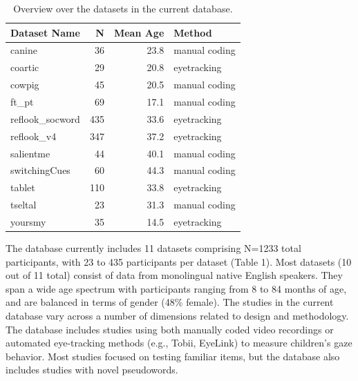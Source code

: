\documentclass[10pt, letterpaper]{article}
\begin{document}
\begin{table}[H]
\centering
\begingroup\fontsize{9pt}{10pt}\selectfont
\begin{tabular}{lrrl}
  \hline
Dataset Name & N & Mean Age & Method \\ 
  \hline
canine & 36 & 23.8 & manual coding \\ 
  coartic & 29 & 20.8 & eyetracking \\ 
  cowpig & 45 & 20.5 & manual coding \\ 
  ft\_pt & 69 & 17.1 & manual coding \\ 
  reflook\_socword & 435 & 33.6 & eyetracking \\ 
  reflook\_v4 & 347 & 37.2 & eyetracking \\ 
  salientme & 44 & 40.1 & manual coding \\ 
  switchingCues & 60 & 44.3 & manual coding \\ 
  tablet & 110 & 33.8 & eyetracking \\ 
  tseltal & 23 & 31.3 & manual coding \\ 
  yoursmy & 35 & 14.5 & eyetracking \\ 
   \hline
\end{tabular}
\endgroup
\caption{Overview over the datasets in the current database.} 
\end{table}

The database currently includes 11 datasets comprising N=1233 total
participants, with 23 to 435 participants per dataset (Table 1). Most
datasets (10 out of 11 total) consist of data from monolingual native
English speakers. They span a wide age spectrum with participants
ranging from 8 to 84 months of age, and are balanced in terms of gender
(48\% female). The studies in the current database vary across a number
of dimensions related to design and methodology. The database includes
studies using both manually coded video recordings or automated
eye-tracking methods (e.g., Tobii, EyeLink) to measure children's gaze
behavior. Most studies focused on testing familiar items, but the
database also includes studies with novel pseudowords.
\end{document}
